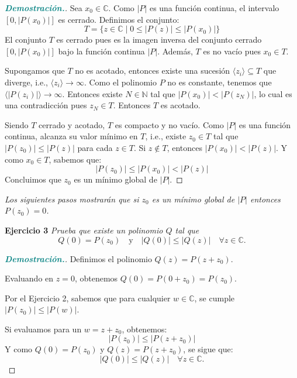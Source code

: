 \documentclass[12pt, letterpaper]{article}
\begin{document}
\begin{proof}[\textbf{\textcolor{teal}{Demostración.}}]
    Sea $x_0 \in \mathbb{C}$. Como $|P|$ es una función continua, el intervalo $[0, |P(x_0)|]$ es cerrado.
    Definimos el conjunto:
    \[ T = \{ z \in \mathbb{C} \mid 0 \leq |P(z)| \leq |P(x_0)| \} \]
    El conjunto $T$ es cerrado pues es la imagen inversa del conjunto cerrado $[0, |P(x_0)|]$ bajo la función continua $|P|$. Además, $T$ es no vacío pues $x_0 \in T$.
    
    Supongamos que $T$ no es acotado, entonces existe una sucesión $\langle z_i \rangle \subseteq T$ que diverge, i.e., $\langle z_i \rangle \to \infty$.
    Como el polinomio $P$ no es constante, tenemos que $\langle |P(z_i)| \rangle \to \infty$.
    Entonces existe $N \in \mathbb{N}$ tal que $|P(x_0)| < |P(z_N)|$, lo cual es una contradicción pues $z_N \in T$. Entonces $T$ es acotado.
    
    Siendo $T$ cerrado y acotado, $T$ es compacto y no vacío. Como $|P|$ es una función continua, alcanza su valor mínimo en $T$, i.e., existe $z_0 \in T$ tal que $|P(z_0)| \leq |P(z)|$ para cada $z \in T$.
    Si $z \notin T$, entonces $|P(x_0)| < |P(z)|$. Y como $x_0 \in T$, sabemos que:
    \[ |P(z_0)| \leq |P(x_0)| < |P(z)| \]
    Concluimos que $z_0$ es un mínimo global de $|P|$.
\end{proof}

\vspace{0.4cm}
\noindent \textit{Los siguientes pasos mostrarán que si $z_0$ es un mínimo global de $|P|$ entonces $P(z_0) = 0$.}

\vspace{0.4cm}
\noindent \textbf{Ejercicio 3} \textit{Prueba que existe un polinomio $Q$ tal que}
\[ Q(0) = P(z_0) \quad \text{y} \quad |Q(0)| \leq |Q(z)| \quad \forall z \in \mathbb{C}. \]

\begin{proof}[\textbf{\textcolor{teal}{Demostración.}}]
    Definimos el polinomio $Q(z) = P(z + z_0)$.
    
    Evaluando en $z = 0$, obtenemos $Q(0) = P(0 + z_0) = P(z_0)$.
    
    Por el Ejercicio 2, sabemos que para cualquier $w \in \mathbb{C}$, se cumple $|P(z_0)| \leq |P(w)|$.
    
    Si evaluamos para un $w = z + z_0$, obtenemos:
    \[ |P(z_0)| \leq |P(z + z_0)| \]
    Y como $Q(0) = P(z_0)$ y $Q(z) = P(z + z_0)$, se sigue que:
    \[ |Q(0)| \leq |Q(z)| \quad \forall z \in \mathbb{C}. \]
\end{proof}
\end{document}

